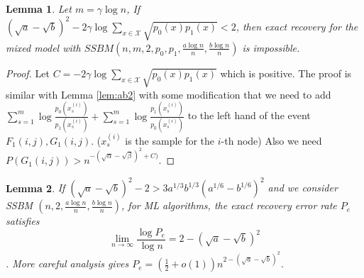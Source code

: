 \documentclass{article}
\newtheorem{lemma}{Lemma}
\begin{document}
\begin{lemma}
	Let $m=\gamma\log n$,
	If $(\sqrt{a} - \sqrt{b})^2 - 2\gamma\log\sum_{x\in\mathcal{X}} \sqrt{p_0(x)p_1(x)} < 2$, then exact recovery for the mixed model with $SSBM(n, m, 2, p_0, p_1, \frac{a \log n}{n}, \frac{b \log n}{n})$
	is impossible.
\end{lemma}
\begin{proof}
	Let $C = - 2\gamma\log\sum_{x\in\mathcal{X}} \sqrt{p_0(x)p_1(x)}$ which is positive.
	The proof is similar with Lemma \ref{lem:ab2} with some modification that we need to add $\sum_{s=1}^m \log \frac{p_0(x^{(i)}_s)}{p_1(x_s^{(i)})}
	+ \sum_{s=1}^m \log \frac{p_1(x^{(i)}_s)}{p_0(x_s^{(i)})}$ to the left hand of the event $F_1(i,j), G_1(i,j)$. ($x_s^{(i)}$ is the sample for the $i$-th node)
	Also we need
	$P(G_1(i,j)) > n^{-(\sqrt{\alpha} - \sqrt{\beta})^2 + C)}$.
\end{proof}
\begin{lemma}\label{lem:UL_bound}
	If $(\sqrt{a}-\sqrt{b})^2-2 > 3a^{1/3}b^{1/3}(a^{1/6}-b^{1/6})^2$ and we consider SSBM $(n, 2, \frac{a\log n}{n}, \frac{b \log n}{n})$, for ML algorithms, the exact recovery error rate $P_e$ satisfies $$
	\lim_{n\to \infty} \frac{\log P_e}{\log n} =2-(\sqrt{a} - \sqrt{b})^2$$.
	More careful analysis gives  $P_e = (\frac{1}{2}+o(1))n^{2-(\sqrt{a} - \sqrt{b})^2}$.
\end{lemma}
\end{document}
